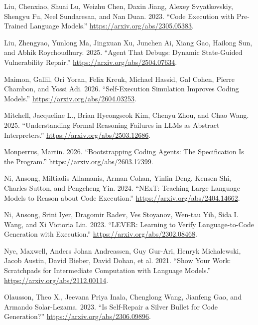 \documentclass{article}
\newlength{\cslhangindent}
\newenvironment{CSLReferences}[2]
 {%
  \setlength{\parindent}{0pt}
  \everypar{\setlength{\hangindent}{\cslhangindent}}\ignorespaces
 }
 {\par}
\begin{document}
\begin{CSLReferences}{1}{0}
\leavevmode{}%
Liu, Chenxiao, Shuai Lu, Weizhu Chen, Daxin Jiang, Alexey Svyatkovskiy,
Shengyu Fu, Neel Sundaresan, and Nan Duan. 2023. {``Code Execution with
Pre-Trained Language Models.''} \url{https://arxiv.org/abs/2305.05383}.

\leavevmode{}%
Liu, Zhengyao, Yunlong Ma, Jingxuan Xu, Junchen Ai, Xiang Gao, Hailong
Sun, and Abhik Roychoudhury. 2025. {``Agent That Debugs: Dynamic
State-Guided Vulnerability Repair.''}
\url{https://arxiv.org/abs/2504.07634}.

\leavevmode{}%
Maimon, Gallil, Ori Yoran, Felix Kreuk, Michael Hassid, Gal Cohen,
Pierre Chambon, and Yossi Adi. 2026. {``Self-Execution Simulation
Improves Coding Models.''} \url{https://arxiv.org/abs/2604.03253}.

\leavevmode{}%
Mitchell, Jacqueline L., Brian Hyeongseok Kim, Chenyu Zhou, and Chao
Wang. 2025. {``Understanding Formal Reasoning Failures in LLMs as
Abstract Interpreters.''} \url{https://arxiv.org/abs/2503.12686}.

\leavevmode{}%
Monperrus, Martin. 2026. {``Bootstrapping Coding Agents: The
Specification Is the Program.''} \url{https://arxiv.org/abs/2603.17399}.

\leavevmode{}%
Ni, Ansong, Miltiadis Allamanis, Arman Cohan, Yinlin Deng, Kensen Shi,
Charles Sutton, and Pengcheng Yin. 2024. {``NExT: Teaching Large
Language Models to Reason about Code Execution.''}
\url{https://arxiv.org/abs/2404.14662}.

\leavevmode{}%
Ni, Ansong, Srini Iyer, Dragomir Radev, Ves Stoyanov, Wen-tau Yih, Sida
I. Wang, and Xi Victoria Lin. 2023. {``LEVER: Learning to Verify
Language-to-Code Generation with Execution.''}
\url{https://arxiv.org/abs/2302.08468}.

\leavevmode{}%
Nye, Maxwell, Anders Johan Andreassen, Guy Gur-Ari, Henryk Michalewski,
Jacob Austin, David Bieber, David Dohan, et al. 2021. {``Show Your Work:
Scratchpads for Intermediate Computation with Language Models.''}
\url{https://arxiv.org/abs/2112.00114}.

\leavevmode{}%
Olausson, Theo X., Jeevana Priya Inala, Chenglong Wang, Jianfeng Gao,
and Armando Solar-Lezama. 2023. {``Is Self-Repair a Silver Bullet for
Code Generation?''} \url{https://arxiv.org/abs/2306.09896}.


\end{CSLReferences}
\end{document}
